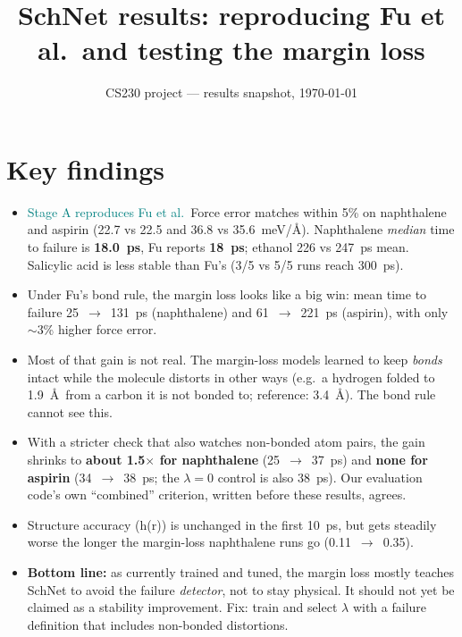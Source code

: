 \documentclass[10pt]{article}
\title{SchNet results: reproducing Fu et al.\ and testing the margin loss}
\author{CS230 project --- results snapshot, \today}
\date{}
\newcommand{\good}[1]{\textcolor{teal}{#1}}
\newcommand{\bad}[1]{\textcolor{red!70!black}{#1}}
\begin{document}
\maketitle
\vspace{-2em}

\section*{Key findings}
\begin{itemize}
  \item \good{Stage A reproduces Fu et al.}\ Force error matches within 5\% on naphthalene and aspirin
        (22.7 vs 22.5 and 36.8 vs 35.6~meV/\AA). Naphthalene \emph{median} time to failure is
        \textbf{18.0~ps}, Fu reports \textbf{18~ps}; ethanol 226 vs 247~ps mean. Salicylic acid is less stable
        than Fu's (3/5 vs 5/5 runs reach 300~ps).
  \item Under Fu's bond rule, the margin loss looks like a big win: mean time to failure
        25~$\to$~131~ps (naphthalene) and 61~$\to$~221~ps (aspirin), with only $\sim$3\% higher force error.
  \item \bad{Most of that gain is not real.} The margin-loss models learned to keep \emph{bonds} intact
        while the molecule distorts in other ways (e.g.\ a hydrogen folded to 1.9~\AA\ from a carbon it is
        not bonded to; reference: 3.4~\AA). The bond rule cannot see this.
  \item With a stricter check that also watches non-bonded atom pairs, the gain shrinks to
        \textbf{about 1.5$\times$ for naphthalene} (25~$\to$~37~ps) and \textbf{none for aspirin} (34~$\to$~38~ps;
        the $\lambda{=}0$ control is also 38~ps). Our evaluation code's own ``combined'' criterion, written before
        these results, agrees.
  \item Structure accuracy (h(r)) is unchanged in the first 10~ps, but gets steadily worse the longer the
        margin-loss naphthalene runs go (0.11~$\to$~0.35).
  \item \textbf{Bottom line:} as currently trained and tuned, the margin loss mostly teaches SchNet to avoid
        the failure \emph{detector}, not to stay physical. It should not yet be claimed as a stability
        improvement. Fix: train and select $\lambda$ with a failure definition that includes non-bonded
        distortions.
\end{itemize}
\end{document}
